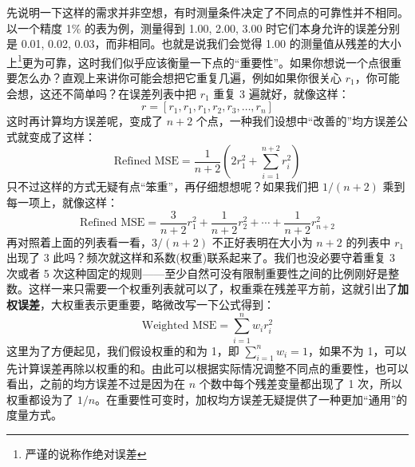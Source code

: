 \documentclass[UTF8, 12pt]{article}
\begin{document}
\begin{itemize}
          先说明一下这样的需求并非空想，有时测量条件决定了不同点的可靠性并不相同。以一个精度 1\% 的表为例，测量得到 1.00, 2.00, 3.00 时它们本身允许的误差分别是 0.01, 0.02, 0.03，而非相同。也就是说我们会觉得 1.00 的测量值从残差的大小上\footnote{严谨的说称作绝对误差}更为可靠，这时我们似乎应该衡量一下点的“重要性”。如果你想说一个点很重要怎么办？直观上来讲你可能会想把它重复几遍，例如如果你很关心 $r_1$，你可能会想，这还不简单吗？在误差列表中把 $r_1$ 重复 3 遍就好，就像这样：
          \[
              r = [r_1, r_1, r_1, r_2, r_3, \ldots, r_n]
          \]
          这时再计算均方误差呢，变成了 $n+2$ 个点，一种我们设想中“改善的”均方误差公式就变成了这样：
          \[
              \text{Refined MSE} = \frac1{n+2} \left(2r_1^2 + \sum_{i=1}^{n+2} r_i^2\right)
          \]
          只不过这样的方式无疑有点“笨重”，再仔细想想呢？如果我们把 $1/(n+2)$ 乘到每一项上，就像这样：
          \[
              \text{Refined MSE} = \frac3{n+2} r_1^2 + \frac1{n+2} r_2^2 + \cdots + \frac1{n+2} r_{n+2}^2
          \]
          再对照着上面的列表看一看，$3/(n+2)$ 不正好表明在大小为 $n+2$ 的列表中 $r_1$ 出现了 3 此吗？频次就这样和系数(权重)联系起来了。我们也没必要守着重复 3 次或者 5 次这种固定的规则——至少自然可没有限制重要性之间的比例刚好是整数。这样一来只需要一个权重列表就可以了，权重乘在残差平方前，这就引出了\textbf{加权误差}，大权重表示更重要，略微改写一下公式得到：
          \[
              \text{Weighted MSE} = \sum_{i=1}^n w_i r_i^2
          \]
          这里为了方便起见，我们假设权重的和为 1，即 $\sum_{i=1}^n w_i = 1$，如果不为 1，可以先计算误差再除以权重的和。由此可以根据实际情况调整不同点的重要性，也可以看出，之前的均方误差不过是因为在 $n$ 个数中每个残差变量都出现了 1 次，所以权重都设为了 $1/n$。在重要性可变时，加权均方误差无疑提供了一种更加“通用”的度量方式。
\end{itemize}
\end{document}
